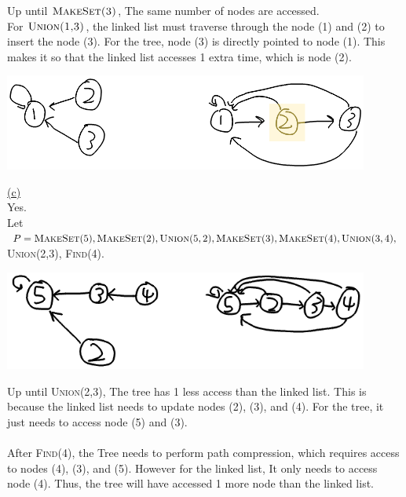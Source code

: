 \documentclass[12pt]{article}
\begin{document}
Up until $\textsc{MakeSet(3)}$, The same number of nodes are accessed. \\
For $\textsc{Union(1,3)}$, the linked list must traverse through the node (1) and (2) to insert the node (3). For the tree, node (3) is directly pointed to node (1). This makes it so that the linked list accesses 1 extra time, which is node (2). 
\begin{center}
	\includegraphics[width=12cm]{CSCB63_A3_3-3.png}
\end{center}
\newpage
\noindent \hyperlink{toc}{\hypertarget{3.3}{(c)}}\\
Yes.\\
Let $P = \textsc{MakeSet}(5), \textsc{MakeSet}(2), \textsc{Union}(5,2), \textsc{MakeSet}(3), \textsc{MakeSet}(4), \textsc{Union}(3,4), $\\ \textsc{Union}(2,3), \textsc{Find(4)}.
\begin{center}
	\includegraphics[width=12cm]{CSCB63_A3_3-4.png}
\end{center}
Up until \textsc{Union}(2,3), The tree has 1 less access than the linked list. This is because the linked list needs to update nodes (2), (3), and (4). For the tree, it just needs to access node (5) and (3).
\\\\
After \textsc{Find(4)}, the Tree needs to perform path compression, which requires access to nodes (4), (3), and (5). However for the linked list, It only needs to access node (4). Thus, the tree will have accessed 1 more node than the linked list.
\end{document}
